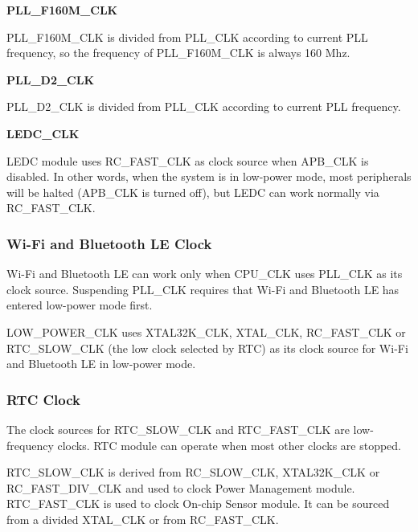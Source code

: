 \documentclass[main\_\_EN.tex]{subfiles}
\begin{document}
\textbf{PLL\_F160M\_CLK}

PLL\_F160M\_CLK is divided from PLL\_CLK according to current PLL frequency, so the frequency of PLL\_F160M\_CLK is always 160 Mhz.  

\textbf{PLL\_D2\_CLK}

PLL\_D2\_CLK is divided from PLL\_CLK according to current PLL frequency.

\textbf{LEDC\_CLK}

LEDC module uses RC\_FAST\_CLK as clock source when APB\_CLK is disabled. In other words, when the system is in low-power mode, 
most peripherals will be halted (APB\_CLK is turned off), but LEDC can work normally via RC\_FAST\_CLK.

\subsubsection{Wi-Fi and Bluetooth LE Clock}
Wi-Fi and Bluetooth LE can work only when CPU\_CLK uses PLL\_CLK as its clock source. Suspending PLL\_CLK requires that Wi-Fi and Bluetooth LE has entered low-power mode first.

LOW\_POWER\_CLK uses XTAL32K\_CLK, XTAL\_CLK, RC\_FAST\_CLK or RTC\_SLOW\_CLK (the low clock selected by RTC) as its clock source for Wi-Fi and Bluetooth LE in low-power mode.

\subsubsection{RTC Clock}

The clock sources for RTC\_SLOW\_CLK and RTC\_FAST\_CLK are low-frequency clocks. RTC module can operate when most other clocks are stopped.

RTC\_SLOW\_CLK is derived from RC\_SLOW\_CLK, XTAL32K\_CLK or RC\_FAST\_DIV\_CLK and used to clock Power Management module. RTC\_FAST\_CLK is used to clock On-chip Sensor module. It can be sourced from a divided XTAL\_CLK or from RC\_FAST\_CLK.
\end{document}
